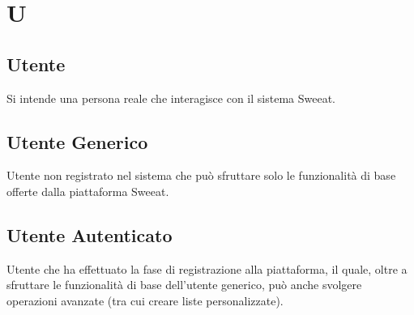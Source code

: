 \section{U}

\subsection{Utente} Si intende una persona reale che interagisce con il sistema Sweeat.

\subsection{Utente Generico} Utente non registrato nel sistema che può sfruttare solo le funzionalità di base offerte dalla piattaforma Sweeat.

\subsection{Utente Autenticato} Utente che ha effettuato la fase di registrazione alla piattaforma, il quale, oltre a sfruttare le funzionalità di base dell’utente generico, può anche svolgere operazioni avanzate (tra cui creare liste personalizzate).

\clearpage